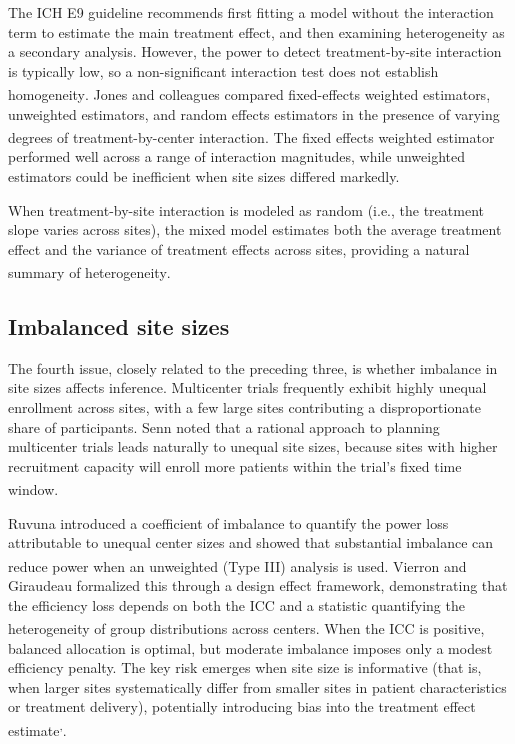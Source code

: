 \documentclass[
  11pt,
]{article}
\begin{document}
The ICH E9 guideline recommends first fitting a model
without the interaction term to estimate the main treatment
effect, and then examining heterogeneity as a secondary
analysis. However, the power to detect treatment-by-site
interaction is typically low, so a non-significant
interaction test does not establish homogeneity\textsuperscript{}. Jones and colleagues compared
fixed-effects weighted estimators, unweighted estimators,
and random effects estimators in the presence of varying
degrees of treatment-by-center interaction\textsuperscript{}. The fixed effects weighted estimator
performed well across a range of interaction magnitudes,
while unweighted estimators could be inefficient when site
sizes differed markedly.

When treatment-by-site interaction is modeled as random
(i.e., the treatment slope varies across sites), the mixed
model estimates both the average treatment effect and the
variance of treatment effects across sites, providing a
natural summary of heterogeneity\textsuperscript{}.

\subsection{Imbalanced site sizes}\label{imbalanced-site-sizes}

The fourth issue, closely related to the preceding three,
is whether imbalance in site sizes affects inference.
Multicenter trials frequently exhibit highly unequal
enrollment across sites, with a few large sites contributing
a disproportionate share of participants. Senn noted that a
rational approach to planning multicenter trials leads
naturally to unequal site sizes, because sites with higher
recruitment capacity will enroll more patients within the
trial's fixed time window\textsuperscript{}.

Ruvuna introduced a coefficient of imbalance to quantify the
power loss attributable to unequal center sizes and showed
that substantial imbalance can reduce power when an
unweighted (Type III) analysis is used\textsuperscript{}.
Vierron and Giraudeau formalized this through a design effect
framework, demonstrating that the efficiency loss depends on
both the ICC and a statistic quantifying the heterogeneity of
group distributions across centers\textsuperscript{}. When
the ICC is positive, balanced allocation is optimal, but
moderate imbalance imposes only a modest efficiency
penalty. The key risk emerges when site size is
informative (that is, when larger sites systematically
differ from smaller sites in patient characteristics or
treatment delivery), potentially introducing bias into
the treatment effect estimate\textsuperscript{,}.
\end{document}
